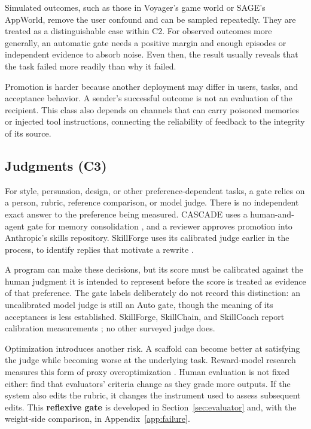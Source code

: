 Simulated outcomes, such as those in Voyager's game world or SAGE's AppWorld, remove the user confound and can be sampled repeatedly. They are treated as a distinguishable case within C2. For observed outcomes more generally, an automatic gate needs a positive margin and enough episodes or independent evidence to absorb noise. Even then, the result usually reveals that the task failed more readily than why it failed.

Promotion is harder because another deployment may differ in users, tasks, and acceptance behavior. A sender's successful outcome is not an evaluation of the recipient. This class also depends on channels that can carry poisoned memories or injected tool instructions, connecting the reliability of feedback to the integrity of its source.

\subsection{Judgments (C3)}\label{judgments-c3}

For style, persuasion, design, or other preference-dependent tasks, a gate relies on a person, rubric, reference comparison, or model judge. There is no independent exact answer to the preference being measured. CASCADE uses a human-and-agent gate for memory consolidation \citep{huang2025cascade}, and a reviewer approves promotion into Anthropic's skills repository. SkillForge uses its calibrated judge earlier in the process, to identify replies that motivate a rewrite \citep{skillforge2026}.

A program can make these decisions, but its score must be calibrated against the human judgment it is intended to represent before the score is treated as evidence of that preference. The gate labels deliberately do not record this distinction: an uncalibrated model judge is still an Auto gate, though the meaning of its acceptances is less established. SkillForge, SkillChain, and SkillCoach report calibration measurements \citep{skillforge2026, hu2026skillchain, zhu2026skillcoach}; no other surveyed judge does.

Optimization introduces another risk. A scaffold can become better at satisfying the judge while becoming worse at the underlying task. Reward-model research measures this form of proxy overoptimization \citep{gao2023overoptimization}. Human evaluation is not fixed either: \citet{shankar2024validators} find that evaluators' criteria change as they grade more outputs. If the system also edits the rubric, it changes the instrument used to assess subsequent edits. This \textbf{reflexive gate} is developed in Section~\ref{sec:evaluator} and, with the weight-side comparison, in Appendix~\ref{app:failure}.

